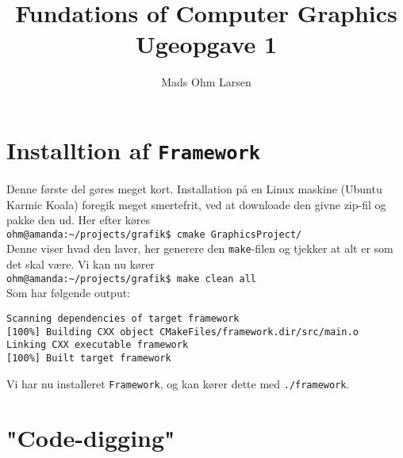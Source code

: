\documentclass[a4paper, 10pt]{article}
\title{Fundations of Computer Graphics\\ Ugeopgave 1}
\author{Mads Ohm Larsen}
\begin{document}
\maketitle

\section{Installtion af \texttt{Framework}}
Denne første del gøres meget kort.
Installation på en Linux maskine (Ubuntu Karmic Koala) foregik meget smertefrit, ved at downloade den givne zip-fil og pakke den ud.
Her efter køres\\ 

\noindent \texttt{ohm@amanda:\textasciitilde/projects/grafik\$ cmake GraphicsProject/}\\

\noindent Denne viser hvad den laver, her generere den \texttt{make}-filen og tjekker at alt er som det skal være.
Vi kan nu kører\\

\noindent \texttt{ohm@amanda:\textasciitilde/projects/grafik\$ make clean all}\\

\noindent Som har følgende output:
\begin{verbatim}
Scanning dependencies of target framework
[100%] Building CXX object CMakeFiles/framework.dir/src/main.o
Linking CXX executable framework
[100%] Built target framework
\end{verbatim}

Vi har nu installeret \texttt{Framework}, og kan kører dette med \texttt{./framework}.

\section{"Code-digging"}
\end{document}
